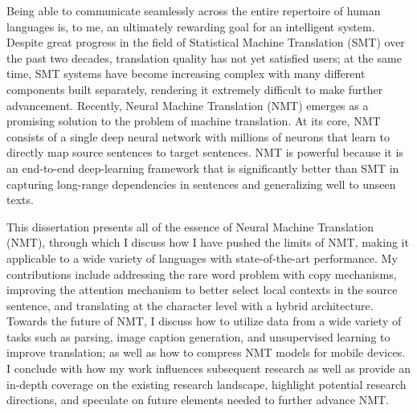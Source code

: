 Being able to communicate seamlessly across the entire repertoire of human
languages is, to me, an ultimately rewarding goal for an intelligent system.
Despite great progress in the field of Statistical Machine Translation (SMT)
over the past two decades, translation quality has not yet satisfied users;
at the same time, SMT systems have become increasing complex with many different
components built separately, rendering it extremely difficult to make further
advancement. Recently, Neural Machine Translation (NMT) emerges as a promising
solution to the problem of machine translation. At its core, NMT consists of a
single deep neural network with millions of neurons that learn to directly map
source sentences to target sentences. NMT is powerful because it is an
end-to-end deep-learning framework that is significantly better than SMT in
capturing long-range dependencies in sentences and generalizing well to unseen
texts.

This dissertation presents all of the essence of Neural Machine Translation
(NMT), through which I discuss how I have pushed the limits of NMT, making it
applicable to a wide variety of languages with state-of-the-art performance. My
contributions include addressing the rare word problem with copy mechanisms,
improving the attention mechanism to better select local contexts in the source
sentence, and translating at the character level with a hybrid architecture.
Towards the future of NMT, I discuss how to utilize data from a wide variety of
tasks such as parsing, image caption generation, and unsupervised learning to
improve translation; as well as how to compress NMT models for mobile devices. I
conclude with how my work influences subsequent research as well as provide an
in-depth coverage on the existing research landscape, highlight potential
research directions, and speculate on future elements needed to further advance
NMT.
